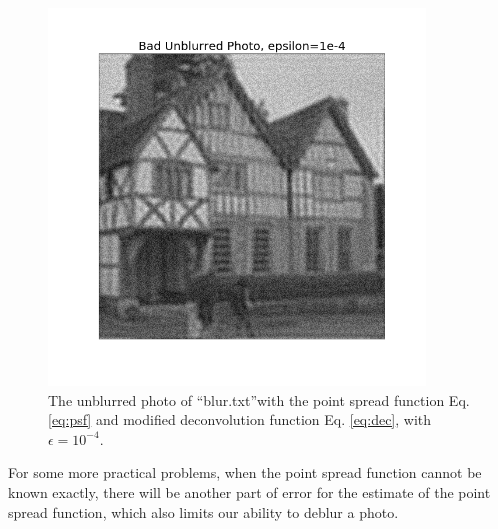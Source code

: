 \documentclass[12pt, graphicx]{article}
\begin{document}
\begin{figure}[ht]
\centering
\includegraphics[width = 100mm]{bad_unblurred(1).png}
\caption{The unblurred photo of \textquotedblleft blur.txt\textquotedblright with the point spread function Eq. \ref{eq:psf} and modified deconvolution function Eq. \ref{eq:dec}, with $\epsilon=10^{-4}$.}
\label{fig:bad4}
\end{figure}

For some more practical problems, when the point spread function cannot be known exactly, there will be another part of error for the estimate of the point spread function, which also limits our ability to deblur a photo.
\end{document}
